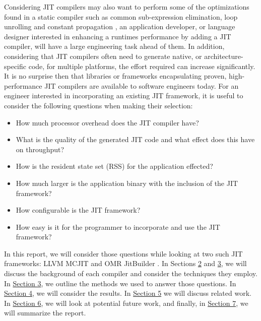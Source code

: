 Considering JIT compilers may also want to perform some of the optimizations found in a static compiler such as common sub-expression elimination, loop unrolling and constant propagation \cite{compilerBook}, an application developer, or language designer interested in enhancing a runtimes performance by adding a JIT compiler, will have a large engineering task ahead of them.
In addition, considering that JIT compilers often need to generate native, or architecture-specific code, for multiple platforms, the effort required can increase significantly.
It is no surprise then that libraries or frameworks encapsulating proven, high-performance JIT compilers are available to software engineers today.
For an engineer interested in incorporating an existing JIT framework, it is useful to consider the following questions when making their selection: 
\begin{itemize}
    \item How much processor overhead does the JIT compiler have?
    \item What is the quality of the generated JIT code and what effect does this have on throughput?
    \item How is the resident state set (RSS) for the application effected?    
    \item How much larger is the application binary with the inclusion of the JIT framework?
    \item How configurable is the JIT framework?
    \item How easy is it for the programmer to incorporate and use the JIT framework?
\end{itemize} 

In this report, we will consider those questions while looking at two such JIT frameworks: LLVM MCJIT \cite{LLVM_Web} and OMR JitBuilder \cite{jitbuilderPaper}.
In Sections \hyperref[sec:llvm]{2} and \hyperref[sec:jitbuilder]{3}, we will discuss the background of each compiler and consider the techniques they employ.
In \hyperref[sec:methodology]{Section 3}, we outline the methods we used to answer those questions.
In \hyperref[sec:results]{Section 4}, we will consider the results.
In \hyperref[sec:related-work]{Section 5} we will discuss related work.
In \hyperref[sec:future-work]{Section 6}, we will look at potential future work, and finally, in \hyperref[sec:summary]{Section 7}, we will summarize the report.